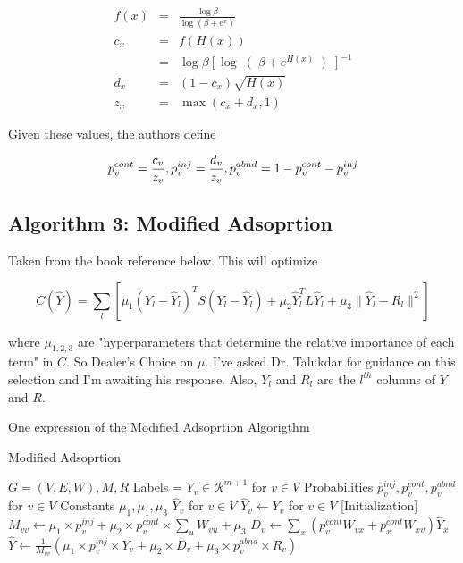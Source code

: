 \documentclass{article}
\begin{document}
\begin{eqnarray}
f(x) &=& \frac{\log \beta}{\log(\beta + e^{x})} \\ 
c_x &=& f(H(x)) \\
&=& \log \beta \left[ \log \right( \beta + e^{H(x)} \left)\right]^{-1} \\
d_x &=& (1-c_x) \sqrt{H(x)} \\
z_x &=& \max( c_x + d_x, 1)
\end{eqnarray}

Given these values, the authors define

\[
p_v^{cont} = \frac{c_v}{z_v}, \vspace{1mm} p_v^{inj} = \frac{d_v}{z_v}, \vspace{1mm} p_v^{abnd} = 1-p_v^{cont}  - p_v^{inj}
\]

\subsection{Algorithm 3: Modified Adsoprtion}

Taken from the book reference below.  This will optimize

\[
C(\hat Y) = \sum_l \left [ \mu_1 \left(Y_l - \hat Y_l \right)^T S\left(Y_l -\hat Y_l\right) + \mu_2 \hat Y_l^T L \hat Y_l + \mu_3 \| \hat Y_l - R_l \|^2 \right]
\]

where $\mu_{1,2,3}$ are "hyperparameters that determine the relative importance of each term" in $C$.  So Dealer's Choice on $\mu$.  I've asked Dr. Talukdar for guidance on this selection and I'm awaiting his response.  Also, $Y_l$ and $R_l$ are the $l^{th}$ columns of $Y$ and $R$. 

\begin{algorithm}
\caption{One expression of the Modified Adsoprtion Algorigthm}
\begin{algorithmic}[1]
\caption{Modified Adsoprtion}\label{euclid}
	  \State $G = (V,E,W), M, R$
	  \State Labels = $Y_v \in \mathcal{R}^{m+1}$ for $v \in V$
	  \State Probabilities $p_v^{inj}, p_v^{cont}, p_v^{abnd}$ for $v \in V$
	  \State Constants $\mu_1, \mu_1, \mu_3$
	\EndProcedure
	  \State $\hat Y_v$ for $v \in V$
	\EndProcedure
	  \State $\hat Y_v \gets Y_v$ for $v \in V$ [Initialization]
	  \State $M_{vv} \gets \mu_1 \times p_v^{inj} + \mu_2 \times p_v^{cont} \times \sum_u W_{vu} + \mu_3$
	  \State $D_v \gets \sum_x \left(p_v^{cont} W_{vx} + p_x^{cont} W_{xv}\right) \hat Y_x $
	    \State $\hat Y \gets \frac{1}{M_{vv}} \left(\mu_1 \times p_v^{inj} \times Y_v + \mu_2 \times D_v + \mu_3 \times p_v^{abnd} \times R_v \right) $ 
	  \EndFor
	\EndWhile
	\EndProcedure
\end{algorithmic}
\end{algorithm}
\end{document}
